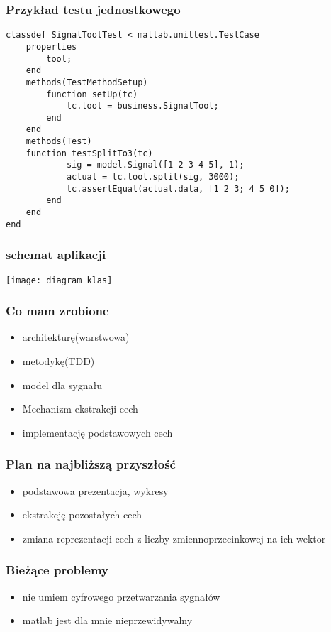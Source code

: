 \documentclass{beamer}
\begin{document}
\begin{frame}[fragile]
  \frametitle{Przykład testu jednostkowego}
\begin{lstlisting}
classdef SignalToolTest < matlab.unittest.TestCase
    properties
        tool;
    end
    methods(TestMethodSetup)
        function setUp(tc)
            tc.tool = business.SignalTool;
        end
    end
    methods(Test)
	function testSplitTo3(tc)
            sig = model.Signal([1 2 3 4 5], 1);
            actual = tc.tool.split(sig, 3000);
            tc.assertEqual(actual.data, [1 2 3; 4 5 0]);
        end
    end
end
\end{lstlisting}
\end{frame}
\begin{frame}
  \frametitle{schemat aplikacji}
    \texttt{[image: diagram\_klas]}
\end{frame}
\begin{frame}
  \frametitle{Co mam zrobione}
    \begin{itemize}
	\item architekturę(warstwowa)
	\item metodykę(TDD)
	\item model dla sygnału
	\item Mechanizm ekstrakcji cech 
	\item implementację podstawowych cech
    \end{itemize}
\end{frame}
\begin{frame}
  \frametitle{Plan na najbliższą przyszłość}
    \begin{itemize}
	\item podstawowa prezentacja, wykresy
	\item ekstrakcję pozostałych cech
	\item zmiana reprezentacji cech z liczby zmiennoprzecinkowej na ich wektor
    \end{itemize}
\end{frame}
\begin{frame}
  \frametitle{Bieżące problemy}
    \begin{itemize}
	\item nie umiem cyfrowego przetwarzania sygnałów
	\item matlab jest dla mnie nieprzewidywalny
    \end{itemize}
\end{frame}
\end{document}
